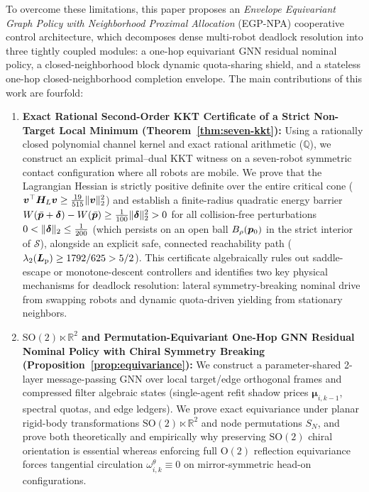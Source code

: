 To overcome these limitations, this paper proposes an \emph{Envelope Equivariant Graph Policy with Neighborhood Proximal Allocation} (EGP-NPA) cooperative control architecture, which decomposes dense multi-robot deadlock resolution into three tightly coupled modules: a one-hop equivariant GNN residual nominal policy, a closed-neighborhood block dynamic quota-sharing shield, and a stateless one-hop closed-neighborhood completion envelope. The main contributions of this work are fourfold:
\begin{enumerate}
 \item \textbf{Exact Rational Second-Order KKT Certificate of a Strict Non-Target Local Minimum (Theorem~\ref{thm:seven-kkt}):} Using a rationally closed polynomial channel kernel and exact rational arithmetic ($\mathbb Q$), we construct an explicit primal--dual KKT witness on a seven-robot symmetric contact configuration where all robots are mobile. We prove that the Lagrangian Hessian is strictly positive definite over the entire critical cone ($\boldsymbol v^{\top}\boldsymbol H_L\boldsymbol v\ge\frac{19}{515}\lVert\boldsymbol v\rVert_2^2$) and establish a finite-radius quadratic energy barrier $W(\bar{\boldsymbol{p}}+\boldsymbol\delta)-W(\bar{\boldsymbol{p}})\ge\frac1{100}\lVert\boldsymbol\delta\rVert_2^2>0$ for all collision-free perturbations $0<\lVert\boldsymbol\delta\rVert_2\le\frac1{200}$ (which persists on an open ball $B_\rho(\boldsymbol{p}_0)$ in the strict interior of $\mathcal S$), alongside an explicit safe, connected reachability path ($\lambda_2(\boldsymbol{L}_{\mathrm{p}})\ge 1792/625>5/2$). This certificate algebraically rules out saddle-escape or monotone-descent controllers and identifies two key physical mechanisms for deadlock resolution: lateral symmetry-breaking nominal drive from swapping robots and dynamic quota-driven yielding from stationary neighbors.
 \item \textbf{$\mathrm{SO}(2)\ltimes\mathbb R^2$ and Permutation-Equivariant One-Hop GNN Residual Nominal Policy with Chiral Symmetry Breaking (Proposition~\ref{prop:equivariance}):} We construct a parameter-shared 2-layer message-passing GNN over local target/edge orthogonal frames and compressed filter algebraic states (single-agent refit shadow prices $\boldsymbol\mu_{i,k-1}$, spectral quotas, and edge ledgers). We prove exact equivariance under planar rigid-body transformations $\mathrm{SO}(2)\ltimes\mathbb R^2$ and node permutations $S_N$, and prove both theoretically and empirically why preserving $\mathrm{SO}(2)$ chiral orientation is essential whereas enforcing full $\mathrm{O}(2)$ reflection equivariance forces tangential circulation $\omega_{i,k}^\theta\equiv 0$ on mirror-symmetric head-on configurations.

\end{enumerate}
